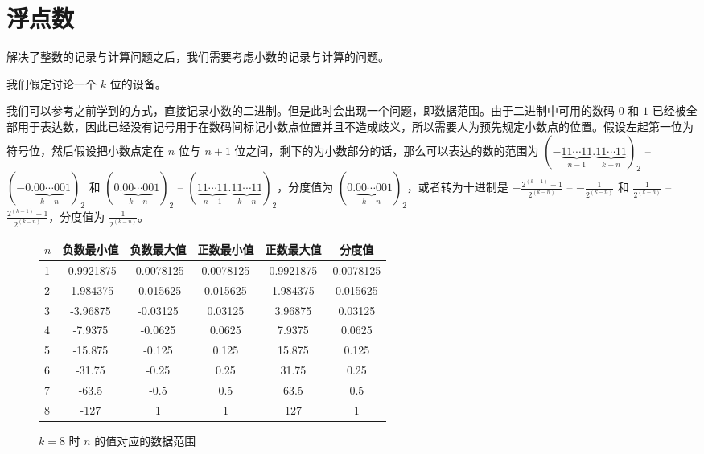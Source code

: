 \section{浮点数}\label{sec:NumberSystemBasics/floating-point}
    解决了整数的记录与计算问题之后，我们需要考虑小数的记录与计算的问题。

    我们假定讨论一个 $k$ 位的设备。

    我们可以参考之前学到的方式，直接记录小数的二进制。但是此时会出现一个问题，即数据范围。由于二进制中可用的数码 $0$ 和 $1$ 已经被全部用于表达数，因此已经没有记号用于在数码间标记小数点位置并且不造成歧义，所以需要人为预先规定小数点的位置。假设左起第一位为符号位，然后假设把小数点定在 $n$ 位与 $n + 1$ 位之间，剩下的为小数部分的话，那么可以表达的数的范围为 $(-\underbrace{11 \cdots 11}_{n-1}.\underbrace{11 \cdots 11}_{k-n})_2$ -- $(-0.\underbrace{00 \cdots 00}_{k-n}1)_2$ 和 $(0.\underbrace{00 \cdots 00}_{k-n}1)_2$ -- $(\underbrace{11 \cdots 11}_{n-1}.\underbrace{11 \cdots 11}_{k-n})_2$，分度值为 $(0.\underbrace{00 \cdots 00}_{k-n}1)_2$，或者转为十进制是 $-\frac{2^{(k-1)}-1}{2^{(k-n)}}$ -- $-\frac{1}{2^{(k-n)}}$ 和 $\frac{1}{2^{(k-n)}}$ -- $\frac{2^{(k-1)}-1}{2^{(k-n)}}$，分度值为 $\frac{1}{2^{(k-n)}}$。

    \begin{figure}
        \centering
        \begin{tabular}{lS[table-format=-3.7]S[table-format=-3.7]S[table-format=-3.7]S[table-format=-3.7]S[table-format=-3.7]}
            $n$ & 负数最小值 & 负数最大值 & 正数最小值 & 正数最大值 & 分度值    \\    & -0.9921875 & -0.0078125 & 0.0078125  & 0.9921875  & 0.0078125 \\
            2   & -1.984375  & -0.015625  & 0.015625   & 1.984375   & 0.015625  \\
            3   & -3.96875   & -0.03125   & 0.03125    & 3.96875    & 0.03125   \\
            4   & -7.9375    & -0.0625    & 0.0625     & 7.9375     & 0.0625    \\
            5   & -15.875    & -0.125     & 0.125      & 15.875     & 0.125     \\
            6   & -31.75     & -0.25      & 0.25       & 31.75      & 0.25      \\
            7   & -63.5      & -0.5       & 0.5        & 63.5       & 0.5       \\
            8   & -127       &  1         & 1          & 127        & 1         \\
        \end{tabular}
        \caption{$k = 8$ 时 $n$ 的值对应的数据范围}
        \label{fig:NumberSystemBasics/floating-point/data-range}
    \end{figure}
